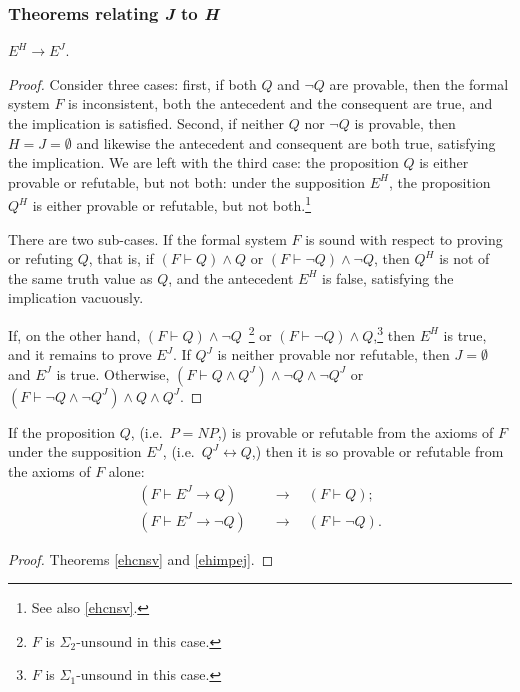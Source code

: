 \documentclass[letterpaper]{article}
\newcommand{\Theorem}{\raisebox{0.5ex}{\large\Beam}}
\begin{document}
\subsubsection{Theorems relating \textit{J} to \textit{H}}
\begin{theorem}\label{ehimpej}
	$E^H\longrightarrow E^J$.
\end{theorem}
\begin{proof}
	Consider three cases: first, if both $Q$ and $\lnot Q$ are provable, then the formal system $F$ is inconsistent, both the antecedent and the consequent are true, and the implication is satisfied.  Second, if neither $Q$ nor $\lnot Q$ is provable, then $H=J=\emptyset$ and likewise the antecedent and consequent are both true, satisfying the implication.  We are left with the third case: the proposition $Q$ is either provable or refutable, but not both: under the supposition $E^H$, the proposition $Q^H$ is either provable or refutable, but not both.\footnote{See also \Theorem \ref{ehcnsv}.}
	
	There are two sub-cases.  If the formal system $F$ is sound with respect to proving or refuting $Q$, that is, if $(F\vdash Q)\land Q$ or $(F\vdash\lnot Q)\land\lnot Q$, then $Q^H$ is not of the same truth value as $Q$, and the antecedent $E^H$ is false, satisfying the implication vacuously.
	
	If, on the other hand, $(F\vdash Q)\land\lnot Q$~\footnote{$F$ is $\Sigma_2$-unsound in this case.} or $(F\vdash\lnot Q)\land Q$,\footnote{$F$ is $\Sigma_1$-unsound in this case.} then $E^H$ is true, and it remains to prove $E^J$.  If $Q^J$ is neither provable nor refutable, then $J=\emptyset$ and $E^J$ is true.  Otherwise,  $(F\vdash Q\land Q^J)\land\lnot Q\land\lnot Q^J$ or $(F\vdash\lnot Q\land\lnot Q^J)\land Q\land Q^J$.
\end{proof}
\begin{corollary}\label{ejcnsv}
	If the proposition $Q$, (i.e.~$P=NP$,) is provable or refutable from the axioms of $F$ under the supposition $E^J$, (i.e.\ $Q^J\longleftrightarrow Q$,) then it is so provable or refutable from the axioms of $F$ alone:
	\begin{align}
		(F\vdash E^J\longrightarrow Q)\quad
		&\longrightarrow\quad(F\vdash Q);\\
		(F\vdash E^J\longrightarrow\lnot Q)\quad
		&\longrightarrow\quad(F\vdash\lnot Q).
	\end{align}
\end{corollary}
\begin{proof}
	Theorems \ref{ehcnsv} and \ref{ehimpej}.
\end{proof}
\end{document}
